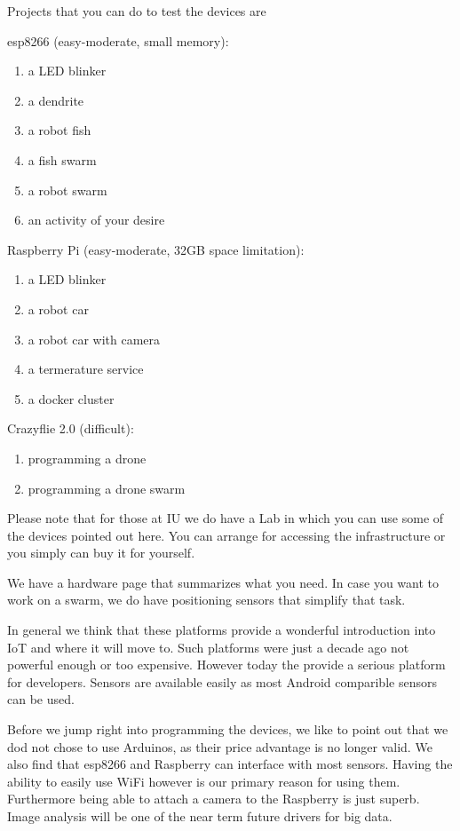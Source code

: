 Projects that you can do to test the devices are

esp8266 (easy-moderate, small memory):

\begin{enumerate}
\def\labelenumi{\arabic{enumi}.}

\item
  a LED blinker
\item
  a dendrite
\item
  a robot fish
\item
  a fish swarm
\item
  a robot swarm
\item
  an activity of your desire
\end{enumerate}

Raspberry Pi (easy-moderate, 32GB space limitation):

\begin{enumerate}
\def\labelenumi{\arabic{enumi}.}

\item
  a LED blinker
\item
  a robot car
\item
  a robot car with camera
\item
  a termerature service
\item
  a docker cluster
\end{enumerate}

Crazyflie 2.0 (difficult):

\begin{enumerate}
\def\labelenumi{\arabic{enumi}.}

\item
  programming a drone
\item
  programming a drone swarm
\end{enumerate}

Please note that for those at IU we do have a Lab in which you can use
some of the devices pointed out here. You can arrange for accessing the
infrastructure or you simply can buy it for yourself.

We have a hardware page that summarizes what you need. In case you want
to work on a swarm, we do have positioning sensors that simplify that
task.

In general we think that these platforms provide a wonderful
introduction into IoT and where it will move to. Such platforms were
just a decade ago not powerful enough or too expensive. However today
the provide a serious platform for developers. Sensors are available
easily as most Android comparible sensors can be used.

Before we jump right into programming the devices, we like to point out
that we dod not chose to use Arduinos, as their price advantage is no
longer valid. We also find that esp8266 and Raspberry can interface with
most sensors. Having the ability to easily use WiFi however is our
primary reason for using them. Furthermore being able to attach a camera
to the Raspberry is just superb. Image analysis will be one of the near
term future drivers for big data.
